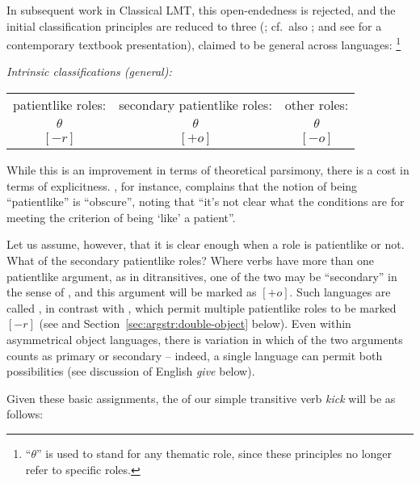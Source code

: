 \documentclass[output=paper]{langscibook}
\begin{document}
In subsequent work in Classical LMT, this open-endedness is rejected, and the
initial classification principles are reduced to three
(\citealp[49]{bresnanzaenen90}; cf.~also \citealt{Her2003,Her2013}; and see
\citealt[331]{BresnanEtAl2016} for a contemporary textbook presentation),
claimed to be general across languages:%
%
\footnote{``$\theta$'' is used to stand for any thematic role, since these
  principles no longer refer to specific roles. }
%

%
\ea\label{ex:new-intrinsic}
\textit{Intrinsic classifications (general):}\\[0.5ex]
\begin{tabular}[t]{@{}ccc}
  patientlike roles: & secondary patientlike roles: & other roles:\\[0.5ex]
  $\theta$ & $\theta$ & $\theta$\\
  $[-r]$ & $[+o]$ & $[-o]$
\end{tabular}
\z
%
While this is an improvement in terms of theoretical parsimony, there is a cost
in terms of explicitness. \citet[32]{asudeh:unrealized}, for instance, complains
that the notion of being ``patientlike'' is ``obscure'', noting that ``it’s not
clear what the conditions are for meeting the criterion of being `like' a
patient''.

Let us assume, however, that it is clear enough when a role is patientlike or
not. What of the secondary patientlike roles? Where verbs have more than one
patientlike argument, as in ditransitives, one of the two may be ``secondary''
in the sense of \citet{dryer:objects}, and this argument will be marked as
$[+o]$. Such languages are called , in
contrast with , which permit multiple
patientlike roles to be marked $[-r]$ (see \citealt{BresMosh90} and
Section~\ref{sec:argstr:double-object} below). Even within asymmetrical object
languages, there is variation in which of the two arguments counts as primary or
secondary -- indeed, a single language can permit both possibilities (see
discussion of English \textit{give} below).

Given these basic assignments, the \astruc{} of our simple transitive verb
\textit{kick} will be as follows:
\end{document}
